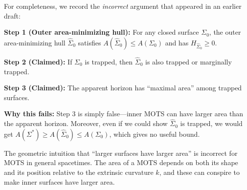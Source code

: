 \begin{remark}
For completeness, we record the \emph{incorrect} argument that appeared in an earlier draft:

\textbf{Step 1 (Outer area-minimizing hull):} For any closed surface $\Sigma_0$, the outer area-minimizing hull $\hat{\Sigma}_0$ satisfies $A(\hat{\Sigma}_0) \le A(\Sigma_0)$ and has $H_{\hat{\Sigma}_0} \ge 0$.

\textbf{Step 2 (Claimed):} If $\Sigma_0$ is trapped, then $\hat{\Sigma}_0$ is also trapped or marginally trapped.

\textbf{Step 3 (Claimed):} The apparent horizon has ``maximal area'' among trapped surfaces.

\textbf{Why this fails:} Step 3 is simply false---inner MOTS can have larger area than the apparent horizon. Moreover, even if we could show $\hat{\Sigma}_0$ is trapped, we would get $A(\Sigma^*) \ge A(\hat{\Sigma}_0) \le A(\Sigma_0)$, which gives no useful bound.

The geometric intuition that ``larger surfaces have larger area'' is incorrect for MOTS in general spacetimes. The area of a MOTS depends on both its shape and its position relative to the extrinsic curvature $k$, and these can conspire to make inner surfaces have larger area.
\end{remark}

